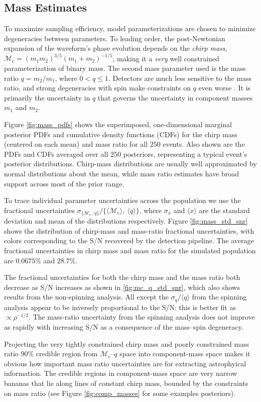 \subsection{Mass Estimates}\label{sec:mass}
To maximize sampling efficiency, model parameterizations are chosen to minimize degeneracies between parameters.  To leading order, the post-Newtonian expansion of the waveform's phase evolution depends on the \emph{chirp mass}, $\mathcal{M}_\mathrm{c} = (m_1 m_2)^{3/5} (m_1 + m_2)^{-1/5}$, making it a \emph{very} well constrained parameterization of binary mass.  The second mass parameter used is the mass ratio $q = m_2/m_1$, where $0 < q \leq 1$.  Detectors are much less sensitive to the mass ratio, and strong degeneracies with spin make constraints on $q$ even worse \citep{Cutler_1994}.  It is primarily the uncertainty in $q$ that governs the uncertainty in component masses $m_1$ and $m_2$.

Figure \ref{fig:mass_pdfs} shows the superimposed, one-dimensional marginal posterior PDFs and cumulative density functions (CDFs) for the chirp mass (centered on each mean) and mass ratio for all $250$ events.  Also shown are the PDFs and CDFs averaged over all $250$ posteriors, representing a typical event's posterior distributions.  Chirp-mass distributions are usually well approximated by normal distributions about the mean, while mass ratio estimates have broad support across most of the prior range.

To trace individual parameter uncertainties across the population we use the fractional uncertainties $\sigma_{\{\mathcal{M}_\mathrm{c},~q\}}/\{\langle\mathcal{M}_\mathrm{c}\rangle,~\langle q\rangle\}$, where $\sigma_x$ and $\langle x\rangle$ are the standard deviation and mean of the distributions respectively.  Figure \ref{fig:mass_std_snr} shows the distribution of chirp-mass and mass-ratio fractional uncertainties, with colors corresponding to the S/N recovered by the detection pipeline. The average fractional uncertainties in chirp mass and mass ratio for the simulated population are $0.0675\%$ and $28.7\%$.

The fractional uncertainties for both the chirp mass and the mass ratio both decrease as S/N increases as shown in \ref{fig:mc_q_std_snr}, which also shows results from the non-spinning analysis. All except the $\sigma_q/\langle q\rangle$ from the spinning analysis appear to be inversely proportional to the S/N: this is better fit as $\propto \rho^{-1/2}$. The mass-ratio uncertainty from the spinning analysis does not improve as rapidly with increasing S/N as a consequence of the mass--spin degeneracy.
  
Projecting the very tightly constrained chirp mass and poorly constrained mass ratio $90\%$ credible region from $\mathcal{M}_\mathrm{c}$--$q$ space into component-mass space makes it obvious how important mass ratio uncertainties are for extracting astrophyical information.  The credible regions in component-mass space are very narrow bananas that lie along lines of constant chirp mass, bounded by the constraints on mass ratio (see Figure \ref{fig:comp_masses} for some examples posteriors).
  
  
  
  
  
  
  